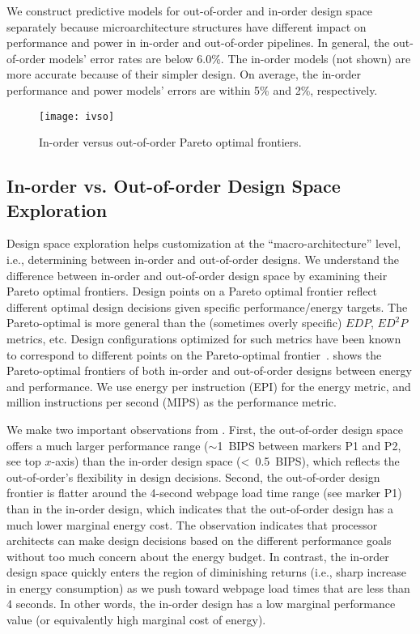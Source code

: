 We construct predictive models for out-of-order and in-order design space separately because microarchitecture structures have different impact on performance and power in in-order and out-of-order pipelines. In general, the out-of-order models' error rates are below 6.0\%. The in-order models (not shown) are more accurate because of their simpler design. On average, the in-order performance and power models' errors are within 5\% and 2\%, respectively.

\begin{figure}[t]
  \centering
  \texttt{[image: ivso]}
  \caption{In-order versus out-of-order Pareto optimal frontiers.}
  \label{fig:ivso}
\end{figure}

\subsection{In-order vs. Out-of-order Design Space Exploration}
\label{sec:arch:customization:core}

Design space exploration helps customization at the ``macro-architecture'' level, i.e., determining between in-order and out-of-order designs. We understand the difference between in-order and out-of-order design space by examining their Pareto optimal frontiers. Design points on a Pareto optimal frontier reflect different optimal design decisions given specific performance/energy targets. The Pareto-optimal is more general than the (sometimes overly specific) $EDP$, $ED^{2}P$ metrics, etc. Design configurations optimized for such metrics have been known to correspond to different points on the Pareto-optimal frontier~\cite{marginal}.  shows the Pareto-optimal frontiers of both in-order and out-of-order designs between energy and performance. We use energy per instruction (EPI) for the energy metric, and million instructions per second (MIPS) as the performance metric. 

We make two important observations from . First, the out-of-order design space offers a much larger performance range ($\sim$1~BIPS between markers P1 and P2, see top $x$-axis) than the in-order design space (\textless~0.5~BIPS), which reflects the out-of-order's flexibility in design decisions. Second, the out-of-order design frontier is flatter around the 4-second webpage load time range (see marker P1) than in the in-order design, which indicates that the out-of-order design has a much lower marginal energy cost. The observation indicates that processor architects can make design decisions based on the different performance goals without too much concern about the energy budget. In contrast, the in-order design space quickly enters the region of diminishing returns (i.e., sharp increase in energy consumption) as we push toward webpage load times that are less than 4 seconds. In other words, the in-order design has a low marginal performance value (or equivalently high marginal cost of energy).


